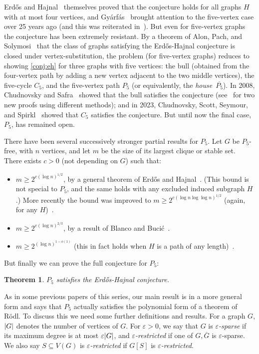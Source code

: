 \documentclass[11pt,reqno,a4paper]{amsart}
\newtheorem{theorem}{Theorem}[section]
\newcommand{\eps}{\varepsilon}
\newcommand{\erh}{Erd\H{o}s-Hajnal}
\DeclarePairedDelimiter\abs{\lvert}{\rvert}%
\begin{document}
	Erd\H{o}s and Hajnal~\cite{MR1031262} themselves proved that the conjecture holds
	for all graphs $H$ with at most four vertices, and Gy\'arf\'as~\cite{MR1425208} brought attention to the five-vertex case over 25 years 
	ago (and this was reiterated in~\cite{MR3150572,MR3497267,scott2022}).
	But even for five-vertex graphs the conjecture has been extremely resistant.
	By a theorem of Alon, Pach, and Solymosi~\cite{MR1832443} that the class of graphs satisfying the \erh{} conjecture is closed under vertex-substitution,
	the problem (for five-vertex graphs) reduces to showing \cref{conj:eh} for three graphs with five vertices: the bull (obtained from the four-vertex path by adding a new vertex adjacent to the two middle vertices),
	the five-cycle $C_5$, and the five-vertex path $P_5$ (or equivalently, the {\em house}~$\overline{P_5}$).
	In 2008, Chudnovsky and Safra~\cite{MR2462320} showed that the bull satisfies the conjecture (see~\cite{MR4563865,density4} for two new 
	proofs using different methods);
	and in 2023, Chudnovsky, Scott, Seymour, and Spirkl~\cite{MR4563865} showed that $C_5$ satisfies the conjecture. But until now
	the final case, $P_5$, has remained open.
	
	There have been several  successively stronger partial results for $P_5$. Let $G$ be $P_5$-free, with $n$ vertices, and let $m$
	be the size of its largest clique or stable set. There exists $c>0$ (not depending on $G$) such that: 
	\begin{itemize}
		\item $m\ge 2^{c(\log n)^{1/2}}$, by a general theorem of Erd\H{o}s and Hajnal~\cite{MR1031262}. (This bound is not special to $P_5$, and the same holds with any excluded induced subgraph $H$.) More recently the bound was improved to
		$m\ge 2^{c(\log n\log \log n)^{1/2}}$ (again, for any $H$)~\cite{density1}.
		\item $m\ge 2^{c(\log n)^{2/3}}$, by a result of Blanco and Buci\'c~\cite{bb2022}.
		\item $m\ge 2^{(\log n)^{1-o(1)}}$ (this in fact holds when $H$ is a path of any length)~\cite{density5}.
	\end{itemize}
	But finally we can prove the full conjecture for $P_5$:
	\begin{theorem}
		\label{thm:p5eh}
		$P_5$ satisfies the \erh{} conjecture.
	\end{theorem}
	As in some previous papers of this series, our main result is in a more general form and says that $P_5$ actually satisfies the polynomial form of a theorem of R\"odl.  To discuss this we need some further definitions and results.
	For a graph $G$, $\abs G$ denotes the number of vertices of $G$.
	For $\eps>0$, we say that $G$ is {\em $\eps$-sparse} if its maximum degree is at most $\eps\abs G$, and {\em $\eps$-restricted} if one of $G,\overline G$ is $\eps$-sparse. We also say $S\subseteq V(G)$ is {\em $\eps$-restricted} if $G[S]$ is {\em $\eps$-restricted}.
	
\end{document}
